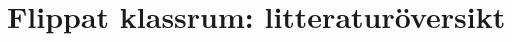 \documentclass[a4paper]{article}
\begin{document}
\section{Flippat klassrum: litteraturöversikt}
{
  \let\subsubsection\subsection
  \let\subsection\subsubsection
  \let\section\subsection
  \begin{refsection}
  
  \printbibliography[heading=subbibintoc,title={Referenser}]
  \end{refsection}
}
\end{document}
